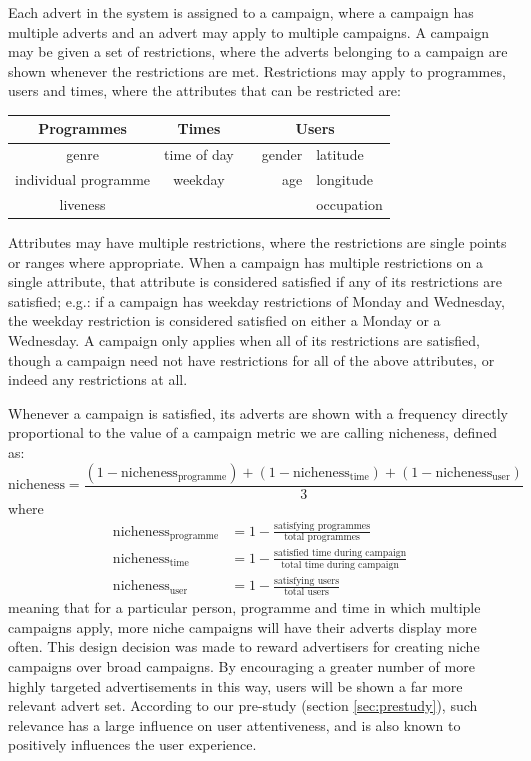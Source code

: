 Each advert in the system is assigned to a campaign, where a campaign has multiple adverts and an advert may apply to multiple campaigns. A campaign may be given a set of restrictions, where the adverts belonging to a campaign are shown whenever the restrictions are met. Restrictions may apply to programmes, users and times, where the attributes that can be restricted are:

\begin{center}
	\begin{tabular}{c c r l}
		\toprule
		\textbf{Programmes} & \textbf{Times} & \multicolumn{2}{c}{\textbf{Users}} \\
		\midrule
		genre & time of day & ~~gender & latitude \\ %
		individual programme & weekday & age & longitude \\
		liveness & & &  occupation \\
		\bottomrule
	\end{tabular}
\end{center}

Attributes may have multiple restrictions, where the restrictions are single points or ranges where appropriate. When a campaign has multiple restrictions on a single attribute, that attribute is considered satisfied if any of its restrictions are satisfied; e.g.: if a campaign has weekday restrictions of Monday and Wednesday, the weekday restriction is considered satisfied on either a Monday or a Wednesday. A campaign only applies when all of its restrictions are satisfied, though a campaign need not have restrictions for all of the above attributes, or indeed any restrictions at all.

Whenever a campaign is satisfied, its adverts are shown with a frequency directly proportional to the value of a campaign metric we are calling nicheness, defined as:
$$
	\text{nicheness} = \frac{(1-\text{nicheness}_\text{programme}) + (1-\text{nicheness}_\text{time}) + (1-\text{nicheness}_\text{user})}{3}
$$
where
\begin{align*}
	\text{nicheness}_\text{programme} &= 1 - \frac{\text{satisfying programmes}}{\text{total programmes}} \\
	\text{nicheness}_\text{time} &= 1 - \frac{\text{satisfied time during campaign}}{\text{total time during campaign}} \\
	\text{nicheness}_\text{user} &= 1 - \frac{\text{satisfying users}}{\text{total users}}
\end{align*}
meaning that for a particular person, programme and time in which multiple campaigns apply, more niche campaigns will have their adverts display more often. This design decision was made to reward advertisers for creating niche campaigns over broad campaigns. By encouraging a greater number of more highly targeted advertisements in this way, users will be shown a far more relevant advert set.
According to our pre-study (section \ref{sec:prestudy}), such relevance has a large influence on user attentiveness, and is also known to positively influences the user experience\citep{yahoo-intrusive-advertising}.

